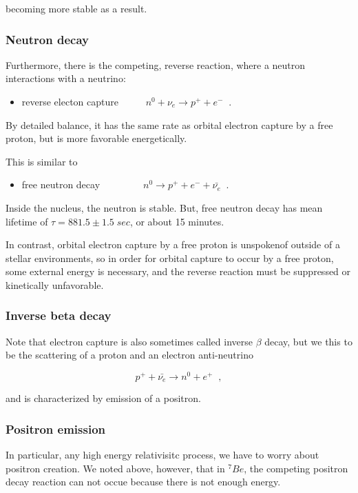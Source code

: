 \documentclass[11pt]{amsart}
\begin{document}
becoming more stable as a result.

\subsubsection{Neutron decay}
Furthermore, there is the competing, reverse reaction, where a neutron interactions with a neutrino:
\begin{itemize}
\item reverse electon capture  $\;\;\;\;\;\;\;\;\;n^{0}+\nu_{e}\rightarrow p^{+}+e^{-}\;\;.$
\end{itemize}

By detailed balance, it has the same rate as orbital electron capture by a free proton, but is more favorable energetically.

This is similar to
\begin{itemize}
\item free neutron decay  $\;\;\;\;\;\;\;\;\;\;\;\;\;\;\;n^{0}\rightarrow p^{+}+e^{-}+\bar{\nu_{e}}\;\;.$
\end{itemize}

Inside the nucleus, the neutron is stable. But, free neutron decay has mean lifetime of $\tau=881.5\pm1.5\;sec $, or about 15 minutes.


In contrast, orbital electron capture by a free proton is unspokenof outside of a stellar environments, so in order for orbital capture to occur by a free proton, some external energy is necessary, and the reverse reaction must be suppressed or kinetically unfavorable.

\subsubsection{Inverse beta decay}

Note that electron capture is also sometimes called inverse $\beta$ decay, but we this to be the scattering of a proton and an electron anti-neutrino 

$$p^{+}+\bar{\nu_{e}} \rightarrow n^{0}+e^{+}\;\;,$$

and is characterized by emission of a positron. 

\subsubsection{Positron emission}

In particular, any high energy relativisitc process, we have to worry about positron creation.  We noted above, however, that in $^{7}Be$, the competing positron decay reaction can not occue because there is not enough energy.    
\end{document}
